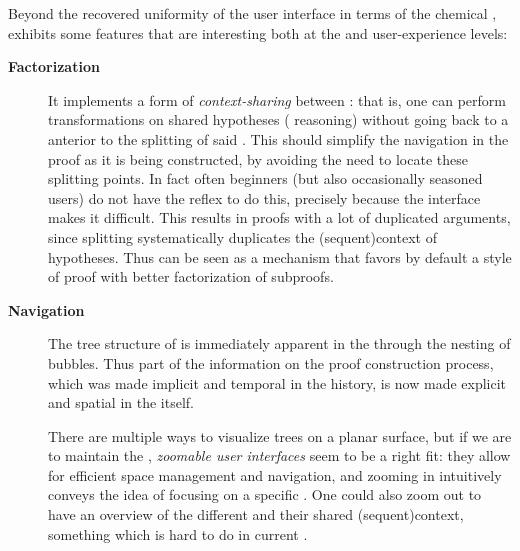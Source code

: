 \begin{scope}
Beyond the recovered uniformity of the user interface in terms of the chemical
,  exhibits some features that are interesting both at the
 and user-experience levels:
\begin{description}
  \item[\textbf{Factorization}] It implements a form of \emph{context-sharing}
    between : that is, one can perform transformations on shared
    hypotheses ( reasoning) without going back to a  anterior
    to the splitting of said . This should simplify the navigation in
    the proof as it is being constructed, by avoiding the need to locate these
    splitting points. In fact often beginners (but also occasionally seasoned
    users) do not have the reflex to do this, precisely because the interface
    makes it difficult. This results in proofs with a lot of duplicated
    arguments, since splitting  systematically duplicates the \kl(sequent){context} of
    hypotheses. Thus  can be seen as a mechanism that favors by default a
    style of proof with better factorization of
    subproofs.

  \item[\textbf{Navigation}] The tree structure of  is immediately
    apparent in the  through the nesting of bubbles. Thus part of the
    information on the proof construction process, which was made implicit and
    temporal in the  history, is now made explicit and spatial in the
     itself.
    
    There are multiple ways to visualize trees on a planar surface, but if we
    are to maintain the  , \emph{zoomable user interfaces} seem to
    be a right fit: they allow for efficient space management and navigation,
    and zooming in intuitively conveys the idea of focusing on a specific
    . One could also zoom out to have an overview of the different
     and their shared \kl(sequent){context}, something which is hard to do in current
    .
    

\end{description}
\end{scope}
